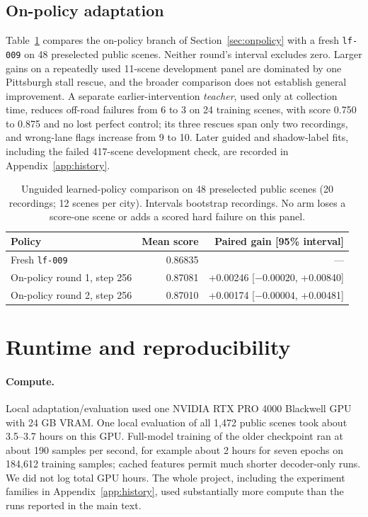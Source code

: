 \documentclass{article}
\newcommand{\lf}{\texttt{lf-009}}
\begin{document}
\subsection{On-policy adaptation}\label{sec:onpolicyresults}
Table~\ref{tab:onpolicy} compares the on-policy branch of Section~\ref{sec:onpolicy} with a fresh \lf{} on 48 preselected public scenes. Neither round's interval excludes zero. Larger gains on a repeatedly used 11-scene development panel are dominated by one Pittsburgh stall rescue, and the broader comparison does not establish general improvement. A separate earlier-intervention \emph{teacher}, used only at collection time, reduces off-road failures from 6 to 3 on 24 training scenes, with score 0.750 to 0.875 and no lost perfect control; its three rescues span only two recordings, and wrong-lane flags increase from 9 to 10. Later guided and shadow-label fits, including the failed 417-scene development check, are recorded in Appendix~\ref{app:history}.

\begin{table}[htbp]
\centering\small
\caption{Unguided learned-policy comparison on 48 preselected public scenes (20 recordings; 12 scenes per city). Intervals bootstrap recordings. No arm loses a score-one scene or adds a scored hard failure on this panel.}\label{tab:onpolicy}
\begin{tabular}{lrr}
\toprule
Policy & Mean score & Paired gain [95\% interval] \\
\midrule
Fresh \lf{} & 0.86835 & --- \\
On-policy round 1, step 256 & 0.87081 & +0.00246 [$-0.00020$, +0.00840] \\
On-policy round 2, step 256 & 0.87010 & +0.00174 [$-0.00004$, +0.00481] \\
\bottomrule
\end{tabular}
\end{table}

\section{Runtime and reproducibility}
\paragraph{Compute.}
Local adaptation/evaluation used one NVIDIA RTX PRO 4000 Blackwell GPU with 24 GB VRAM. One local evaluation of all 1,472 public scenes took about 3.5--3.7 hours on this GPU. Full-model training of the older checkpoint ran at about 190 samples per second, for example about 2 hours for seven epochs on 184,612 training samples; cached features permit much shorter decoder-only runs. We did not log total GPU hours. The whole project, including the experiment families in Appendix~\ref{app:history}, used substantially more compute than the runs reported in the main text.
\end{document}
